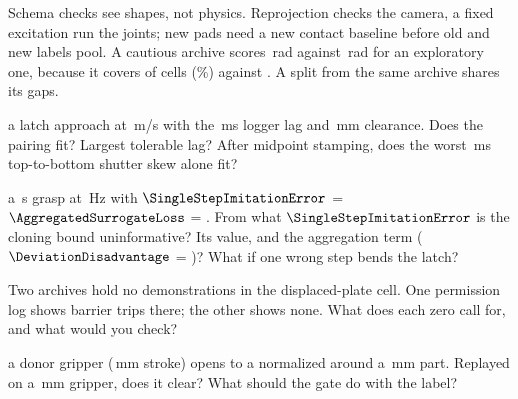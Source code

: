 \documentclass{studysheet}
\begin{document}
\begin{rightcol}
%
  {Schema checks see shapes, not physics. Reprojection checks the camera, a fixed excitation run the
   joints; new pads need a new contact baseline before old and new labels pool.}{}
%
  {A cautious archive scores \,rad against \,rad for an exploratory one,
   because it covers  of  cells (\%) against .
   A split from the same archive shares its gaps.}{}

\vspace{2pt}
\begin{qs}
\item \assumed{} a latch approach at \,m/s with the \,ms logger lag and \,mm
  clearance. Does the pairing fit? Largest tolerable lag? After midpoint stamping, does the worst
  \,ms top-to-bottom shutter skew alone fit?
\item \assumed{} a \,s grasp at \,Hz with $\SingleStepImitationError$ = $\AggregatedSurrogateLoss$ = . From what
  $\SingleStepImitationError$ is the cloning bound uninformative? Its value, and the aggregation term
  ($\DeviationDisadvantage$ = )? What if one wrong step bends the latch?
\item Two archives hold no demonstrations in the displaced-plate cell. One permission log shows barrier
  trips there; the other shows none. What does each zero call for, and what would you check?
\item \assumed{} a donor gripper (\,mm stroke) opens to a normalized  around a
  \,mm part. Replayed on a \,mm gripper, does it clear? What should the
  gate do with the label?
\end{qs}
\end{rightcol}
\end{document}
